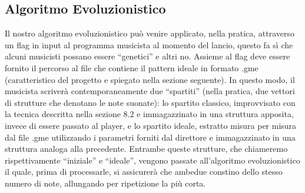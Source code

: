 \subsection{Algoritmo Evoluzionistico}
\label{sec:evol_alg}
Il nostro algoritmo evoluzionistico può venire applicato, nella pratica, attraverso un flag in input al programma musicista al momento del lancio, questo fa sì che alcuni musicisti possano essere ``genetici'' e altri no.
Assieme al flag deve essere fornito il percorso al file che contiene il pattern ideale in formato .gme (caratteristico del progetto e spiegato nella sezione seguente).
In questo modo, il musicista scriverà contemporaneamente due ``spartiti'' (nella pratica, due vettori di strutture che denotano le note suonate): lo spartito classico, improvvisato con la tecnica descritta nella sezione 8.2 e immagazzinato in una struttura apposita, invece di essere passato al player, e lo spartito ideale, estratto misura per misura dal file .gme utilizzando i parametri forniti dal direttore e immagazzinato in una struttura analoga alla precedente.
Entrambe queste strutture, che chiameremo rispettivamente ``iniziale'' e ``ideale'', vengono passate all'algoritmo evoluzionistico il quale, prima di processarle, si assicurerà che ambedue constino dello stesso numero di note, allungando per ripetizione la più corta.
\newline

